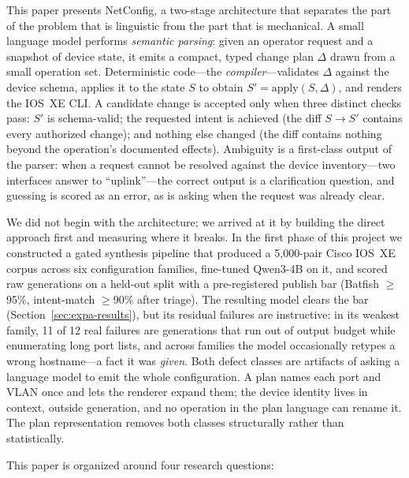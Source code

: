 \documentclass[conference]{IEEEtran}
\begin{document}
This paper presents NetConfig, a two-stage architecture that separates the part of the problem that is linguistic from the part that is mechanical. A small language model performs \emph{semantic parsing}: given an operator request and a snapshot of device state, it emits a compact, typed change plan $\Delta$ drawn from a small operation set. Deterministic code---the \emph{compiler}---validates $\Delta$ against the device schema, applies it to the state $S$ to obtain $S' = \mathrm{apply}(S, \Delta)$, and renders the IOS~XE CLI. A candidate change is accepted only when three distinct checks pass: $S'$ is schema-valid; the requested intent is achieved (the diff $S \rightarrow S'$ contains every authorized change); and nothing else changed (the diff contains nothing beyond the operation's documented effects). Ambiguity is a first-class output of the parser: when a request cannot be resolved against the device inventory---two interfaces answer to ``uplink''---the correct output is a clarification question, and guessing is scored as an error, as is asking when the request was already clear.

We did not begin with the architecture; we arrived at it by building the direct approach first and measuring where it breaks. In the first phase of this project we constructed a gated synthesis pipeline that produced a 5,000-pair Cisco IOS~XE corpus across six configuration families, fine-tuned Qwen3-4B on it, and scored raw generations on a held-out split with a pre-registered publish bar (Batfish $\geq$95\%, intent-match $\geq$90\% after triage). The resulting model clears the bar (Section~\ref{sec:expa-results}), but its residual failures are instructive: in its weakest family, 11 of 12 real failures are generations that run out of output budget while enumerating long port lists, and across families the model occasionally retypes a wrong hostname---a fact it was \emph{given}. Both defect classes are artifacts of asking a language model to emit the whole configuration. A plan names each port and VLAN once and lets the renderer expand them; the device identity lives in context, outside generation, and no operation in the plan language can rename it. The plan representation removes both classes structurally rather than statistically.

This paper is organized around four research questions:
\end{document}
